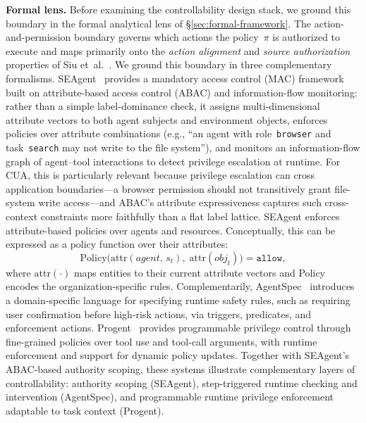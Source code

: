 \noindent\textbf{Formal lens.}
Before examining the controllability design stack, we ground this boundary in the formal analytical lens of \S\ref{sec:formal-framework}. The action-and-permission boundary governs which actions the policy~$\pi$ is authorized to execute and maps primarily onto the \emph{action alignment} and \emph{source authorization} properties of Siu et~al.~\cite{siu2026formalizing}. We ground this boundary in three complementary formalisms. SEAgent~\cite{seagent2026} provides a mandatory access control (MAC) framework built on attribute-based access control (ABAC) and information-flow monitoring: rather than a simple label-dominance check, it assigns multi-dimensional attribute vectors to both agent subjects and environment objects, enforces policies over attribute combinations (e.g., ``an agent with role~\texttt{browser} and task~\texttt{search} may not write to the file system''), and monitors an information-flow graph of agent--tool interactions to detect privilege escalation at runtime. For CUA, this is particularly relevant because privilege escalation can cross application boundaries---a browser permission should not transitively grant file-system write access---and ABAC's attribute expressiveness captures such cross-context constraints more faithfully than a flat label lattice. SEAgent enforces attribute-based policies over agents and resources. Conceptually, this can be expressed as a policy function over their attributes:
\begin{equation}
  \mathrm{Policy}\bigl(\mathrm{attr}(\mathit{agent},\, s_t),\; \mathrm{attr}(\mathit{obj}_t)\bigr) = \texttt{allow},
  \label{eq:abac-check}
\end{equation}
where $\mathrm{attr}(\cdot)$ maps entities to their current attribute vectors and Policy encodes the organization-specific rules. Complementarily, AgentSpec~\cite{agentspec2025} introduces a domain-specific language for specifying runtime safety rules, such as requiring user confirmation before high-risk actions, via triggers, predicates, and enforcement actions. Progent~\cite{progent2025} provides programmable privilege control through fine-grained policies over tool use and tool-call arguments, with runtime enforcement and support for dynamic policy updates. Together with SEAgent's ABAC-based authority scoping, these systems illustrate complementary layers of controllability: authority scoping (SEAgent), step-triggered runtime checking and intervention (AgentSpec), and programmable runtime privilege enforcement adaptable to task context (Progent).

